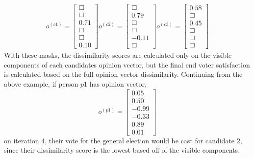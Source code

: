 \begin{align*}
o^{(c1)} = \begin{bmatrix}\Box \\ \Box \\ 0.71 \\ \Box \\ \Box \\ 0.10  \end{bmatrix}
o^{(c2)} = \begin{bmatrix}\Box \\ 0.79 \\ \Box \\ \Box \\ -0.11\\ \Box  \end{bmatrix}
o^{(c3)} = \begin{bmatrix}0.58 \\ \Box \\ 0.45 \\ \Box \\ \Box \\ \Box  \end{bmatrix}
\end{align*}
With these masks, the dissimilarity scores are calculated only on the visible components of each candidates opinion vector, but the final end voter satisfaction is calculated based on the full opinion vector dissimilarity.
Continuing from the above example, if person $p1$ has opinion vector, $$o^{(p1)}=\begin{bmatrix}0.05\\0.50\\-0.99\\-0.33\\0.89\\0.01\end{bmatrix}$$  on iteration 4, their vote for the general election would be cast for candidate 2, since their dissimilarity score is the lowest based off of the visible components.
